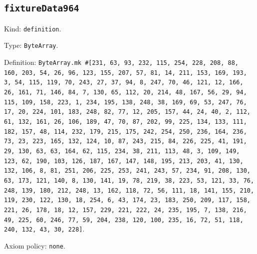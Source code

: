\documentclass[11pt]{article}
\begin{document}
\subsection*{\texttt{fixtureData964}}
\noindent Kind: \texttt{definition}.\par
\noindent Type: \texttt{ByteArray}.\par
\noindent Definition: \texttt{ByteArray.mk \#[231, 63, 93, 232, 115, 254, 228, 208, 88, 160, 203, 54, 26, 96, 123, 155, 207, 57, 81, 14, 211, 153, 169, 193, 3, 54, 115, 119, 70, 243, 27, 37, 94, 8, 247, 70, 46, 121, 12, 166, 26, 161, 71, 146, 84, 7, 130, 65, 112, 20, 214, 48, 167, 56, 29, 94, 115, 109, 158, 223, 1, 234, 195, 138, 248, 38, 169, 69, 53, 247, 76, 17, 20, 224, 101, 183, 248, 82, 77, 12, 205, 157, 44, 24, 40, 2, 112, 61, 132, 161, 26, 106, 189, 47, 70, 87, 202, 99, 225, 134, 133, 111, 182, 157, 48, 114, 232, 179, 215, 175, 242, 254, 250, 236, 164, 236, 73, 23, 223, 165, 132, 124, 10, 87, 243, 215, 84, 226, 225, 41, 191, 29, 130, 63, 63, 164, 62, 115, 234, 38, 211, 113, 48, 3, 109, 149, 123, 62, 190, 103, 126, 187, 167, 147, 148, 195, 213, 203, 41, 130, 132, 106, 8, 81, 251, 206, 225, 253, 241, 243, 57, 234, 91, 208, 130, 63, 173, 121, 140, 8, 130, 141, 19, 78, 219, 38, 223, 53, 121, 33, 76, 248, 139, 180, 212, 248, 13, 162, 118, 72, 56, 111, 18, 141, 155, 210, 119, 230, 122, 130, 18, 254, 6, 43, 174, 23, 183, 250, 209, 117, 158, 221, 26, 178, 18, 12, 157, 229, 221, 222, 24, 235, 195, 7, 138, 216, 49, 225, 60, 246, 77, 59, 204, 238, 120, 100, 235, 16, 72, 51, 118, 240, 132, 43, 30, 228]}.\par
\noindent Axiom policy: \texttt{none}.\par
\end{document}
